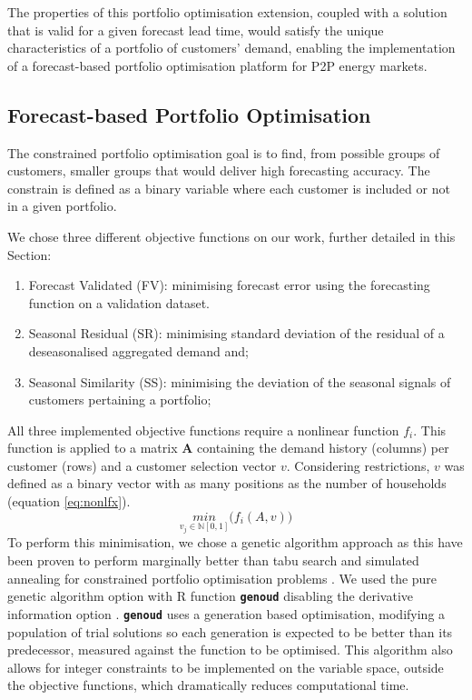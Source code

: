 \documentclass[review, 3p, 12pt, authoryear]{elsarticle}
\begin{document}
The properties of this portfolio optimisation extension, coupled with a solution that is valid for a given forecast lead time, would satisfy the unique characteristics of a portfolio of customers' demand, enabling the implementation of a forecast-based portfolio optimisation platform for P2P energy markets.

\subsection{Forecast-based Portfolio Optimisation}
\label{ss:portopt}

The constrained portfolio optimisation goal is to find, from possible groups of customers, smaller groups that would deliver high forecasting accuracy.
The constrain is defined as a binary variable where each customer is included or not in a given portfolio.

We chose three different objective functions on our work, further detailed in this Section:
\begin{enumerate}
   \item Forecast Validated (FV): minimising forecast error using the forecasting function on a validation dataset.
   \item Seasonal Residual (SR): minimising standard deviation of the residual of a deseasonalised aggregated demand and;
   \item Seasonal Similarity (SS): minimising the deviation of the seasonal signals of customers pertaining a portfolio;
\end{enumerate}
All three implemented objective functions require a nonlinear function $f_i$.
This function is applied to a matrix $\bm{A}$ containing the demand history (columns) per customer (rows) and a customer selection vector $v$.
Considering restrictions, $v$ was defined as a binary vector with as many positions as the number of households (equation \ref{eq:nonlfx}).
\begin{equation}
   \underset{v_j \in \mathbb N[0,1]}{min}\big(f_i(A,v)\big)
   \label{eq:nonlfx}
\end{equation}
To perform this minimisation, we chose a genetic algorithm approach as this have been proven to perform marginally better than tabu search and simulated annealing for constrained portfolio optimisation problems \citep{CHANG20001271}.
We used the pure genetic algorithm option with R function \texttt{\textbf{genoud}} disabling the derivative information option \citep{rgenoud}.
\texttt{\textbf{genoud}} uses a generation based optimisation, modifying a population of trial solutions so each generation is expected to be better than its predecessor, measured against the function to be optimised.
This algorithm also allows for integer constraints to be implemented on the variable space, outside the objective functions, which dramatically reduces computational time.
\end{document}
